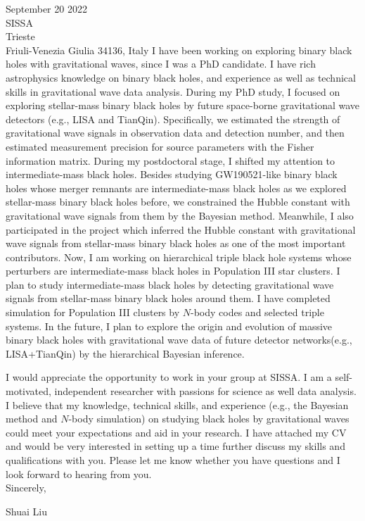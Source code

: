 \documentclass[11pt,a4paper,sans]{letter} %
\begin{document}
\begin{letter}{September 20 2022 \\
SISSA\\
Trieste\\ 
Friuli-Venezia Giulia 34136, Italy}
I have been working on exploring binary black holes with gravitational waves, since I was a PhD candidate. I
    have rich astrophysics knowledge on binary black holes, and experience as well as technical skills in gravitational wave data analysis. During my PhD study, I focused on exploring stellar-mass binary black holes by future
    space-borne gravitational wave detectors (e.g., LISA and TianQin). Specifically, we estimated the strength of
    gravitational wave signals in observation data and detection number, and then estimated
    measurement precision for source parameters with the Fisher information matrix. During my postdoctoral stage, I shifted
    my attention to intermediate-mass black holes. Besides studying GW190521-like binary black holes whose merger remnants are
    intermediate-mass black holes as we explored stellar-mass binary black holes before, we constrained the
    Hubble constant with gravitational wave signals from them by the Bayesian method. Meanwhile, I also participated
    in the project which inferred the Hubble
    constant with gravitational wave signals from stellar-mass binary black holes as one of the most important
    contributors. Now, I am working on
    hierarchical triple
    black hole systems whose perturbers are intermediate-mass black holes in Population III star clusters. I plan to
    study intermediate-mass black holes by detecting gravitational wave signals from stellar-mass binary black holes
    around them. I have completed simulation for Population III
    clusters by $N$-body codes and selected triple systems.  
    In the future, I plan to explore the origin and evolution of massive binary black holes with gravitational wave
    data of future detector networks(e.g., LISA+TianQin) by the hierarchical Bayesian inference.

I would appreciate the opportunity to work in your group at SISSA. I am a self-motivated, independent researcher with
    passions for science as well data analysis. I believe that my knowledge,
    technical skills, and experience (e.g., the Bayesian method and $N$-body simulation) on studying black holes by
    gravitational waves could meet your expectations and aid in your research. I have attached my CV and would be very interested in setting up a time further
discuss my skills and qualifications with you. Please let me know whether you have questions and I look forward to
hearing from you.\\

Sincerely,

Shuai Liu




\end{letter}
\end{document}
